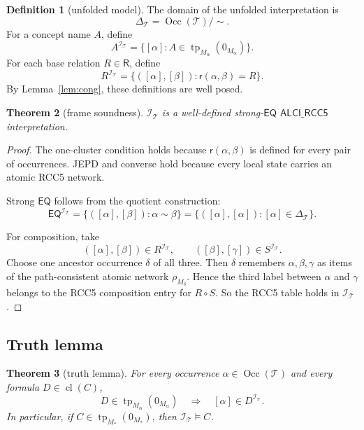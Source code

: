 \documentclass[11pt]{article}
\newtheorem{theorem}{Theorem}[section]
\theoremstyle{definition}
\newtheorem{definition}[theorem]{Definition}
\newcommand{\ALCIRCC}{\mathsf{ALCI\_RCC5}}
\newcommand{\cl}{\operatorname{cl}}
\newcommand{\tp}{\operatorname{tp}}
\newcommand{\Roles}{\mathsf{R}}
\newcommand{\Eq}{\mathsf{EQ}}
\newcommand{\occ}{\operatorname{Occ}}
\begin{document}
\begin{definition}[unfolded model]
The domain of the unfolded interpretation is
\[
\Delta_{\mathcal T}=\occ(\mathcal T)/{\sim}.
\]
For a concept name $A$, define
\[
A^{\mathcal I_{\mathcal T}}
=
\{[\alpha]: A\in \tp_{M_\alpha}(0_{M_\alpha})\}.
\]
For each base relation $R\in \Roles$, define
\[
R^{\mathcal I_{\mathcal T}}
=
\{([\alpha],[\beta]): \mathsf r(\alpha,\beta)=R\}.
\]
By Lemma~\ref{lem:cong}, these definitions are well posed.
\end{definition}

\begin{theorem}[frame soundness]\label{thm:frame}
$\mathcal I_{\mathcal T}$ is a well-defined strong-$\Eq$ $\ALCIRCC$ interpretation.
\end{theorem}

\begin{proof}
The one-cluster condition holds because $\mathsf r(\alpha,\beta)$ is defined for every pair of occurrences. JEPD and converse hold because every local state carries an atomic RCC5 network.

Strong $\Eq$ follows from the quotient construction:
\[
\Eq^{\mathcal I_{\mathcal T}}=
\{([\alpha],[\beta]):\alpha\sim\beta\}
=
\{([\alpha],[\alpha]):[\alpha]\in \Delta_{\mathcal T}\}.
\]

For composition, take
\[
([\alpha],[\beta])\in R^{\mathcal I_{\mathcal T}},
\qquad
([\beta],[\gamma])\in S^{\mathcal I_{\mathcal T}}.
\]
Choose one ancestor occurrence $\delta$ of all three. Then $\delta$ remembers $\alpha,\beta,\gamma$ as items of the path-consistent atomic network $\rho_{M_\delta}$. Hence the third label between $\alpha$ and $\gamma$ belongs to the RCC5 composition entry for $R\circ S$. So the RCC5 table holds in $\mathcal I_{\mathcal T}$.
\end{proof}

\subsection{Truth lemma}

\begin{theorem}[truth lemma]\label{thm:truth}
For every occurrence $\alpha\in \occ(\mathcal T)$ and every formula $D\in \cl(C)$,
\[
D\in \tp_{M_\alpha}(0_{M_\alpha})
\quad\Longrightarrow\quad
[\alpha]\in D^{\mathcal I_{\mathcal T}}.
\]
In particular, if $C\in \tp_{M_\ast}(0_{M_\ast})$, then $\mathcal I_{\mathcal T}\models C$.
\end{theorem}
\end{document}
